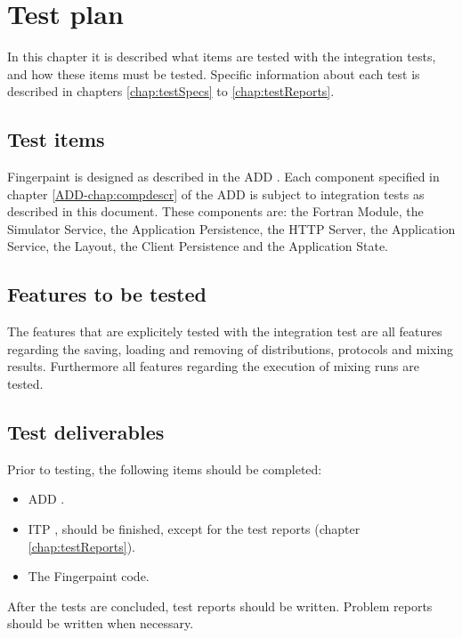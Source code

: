 \chapter{Test plan}
\label{chap:testPlan}
In this chapter it is described what items are tested with the integration tests, and how these items must be tested. Specific information about each test is described in chapters \ref{chap:testSpecs} to \ref{chap:testReports}.

\section{Test items}
Fingerpaint is designed as described in the ADD \cite{add}. Each component specified in chapter \ref*{ADD-chap:compdescr} of the ADD \cite{add} is subject to integration tests as described in this document. These components are: the Fortran Module, the Simulator Service, the Application Persistence, the HTTP Server, the Application Service, the Layout, the Client Persistence and the Application State. %

\section{Features to be tested}
The features that are explicitely tested with the integration test are all features regarding the saving, loading and removing of distributions, protocols and mixing results. Furthermore all features regarding the execution of mixing runs are tested.

\section{Test deliverables}
Prior to testing, the following items should be completed:
\begin{itemize}
\item ADD \cite{add}.
\item ITP \cite{itp}, should be finished, except for the test reports (chapter \ref{chap:testReports}).
\item The Fingerpaint code.
\end{itemize}
After the tests are concluded, test reports should be written. Problem reports should be written when necessary.

